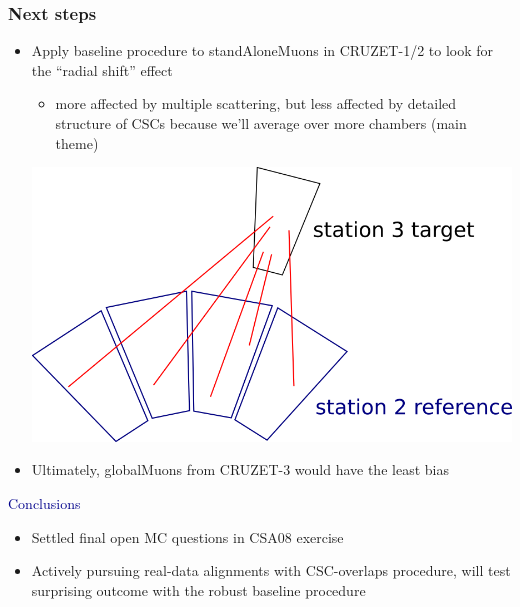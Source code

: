 \documentclass[compress]{beamer}
\begin{document}

\begin{frame}
\frametitle{Next steps}
\small

\begin{itemize}
\item Apply baseline procedure to standAloneMuons in CRUZET-1/2 to look for the ``radial shift'' effect
\begin{itemize}
\item more affected by multiple scattering, but less affected by
  detailed structure of CSCs because we'll average over more chambers (main theme)
\end{itemize}

\vspace{-0.5 cm}
\begin{center}
\includegraphics[width=0.5\linewidth]{baselineStandAloneMuons.png}
\end{center}

\item Ultimately, globalMuons from CRUZET-3 would have the least bias

\end{itemize}

\vspace{0.1 cm}
\hspace{-0.83 cm} \textcolor{darkblue}{\Large Conclusions}

\begin{itemize}
\item Settled final open MC questions in CSA08 exercise

\item Actively pursuing real-data alignments with CSC-overlaps procedure,
will test surprising outcome with the robust baseline procedure
\end{itemize}

\label{numpages}
\end{frame}
\end{document}

